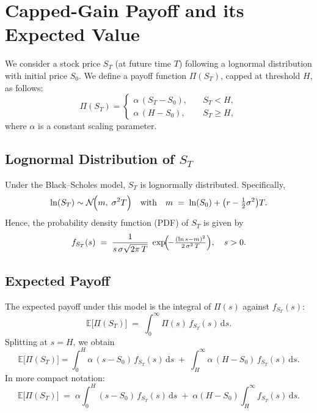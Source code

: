 \documentclass[12pt]{article}
\begin{document}
\section*{Capped-Gain Payoff and its Expected Value}

We consider a stock price $S_T$ (at future time $T$) following a lognormal distribution with initial price $S_0$. 
We define a payoff function $\Pi(S_T)$, capped at threshold $H$, as follows:
\[
\Pi(S_T) 
= 
\begin{cases} 
\alpha\,(S_T - S_0), & \quad S_T < H,\\[6pt]
\alpha\,(H - S_0),   & \quad S_T \ge H,
\end{cases}
\]
where $\alpha$ is a constant scaling parameter.

\subsection*{Lognormal Distribution of $S_T$}
Under the Black--Scholes model, $S_T$ is lognormally distributed. Specifically,
\[
\ln(S_T) \sim \mathcal{N}\!\Bigl(m,\;\sigma^2 T\Bigr)
\quad\text{with}\quad
m \;=\; \ln(S_0) + \bigl(r - \tfrac{1}{2}\sigma^2\bigr) T.
\]
Hence, the probability density function (PDF) of $S_T$ is given by
\[
f_{S_T}(s)
\;=\;
\frac{1}{s\,\sigma \sqrt{2\pi\,T}}
\;\exp\!\Bigl(\!-\tfrac{(\ln s - m)^2}{2\,\sigma^2\,T}\Bigr),
\quad
s>0.
\]

\subsection*{Expected Payoff}
The expected payoff under this model is the integral of $\Pi(s)$ against $f_{S_T}(s)$:
\[
\mathbb{E}\bigl[\Pi(S_T)\bigr]
\;=\;
\int_{0}^{\infty} \Pi(s)\,f_{S_T}(s)\,\mathrm{d}s.
\]
Splitting at $s=H$, we obtain
\[
\mathbb{E}\bigl[\Pi(S_T)\bigr]
=
\int_{0}^{H} \alpha\,(s - S_0)\,f_{S_T}(s)\,\mathrm{d}s
\;+\;
\int_{H}^{\infty} \alpha\,(H - S_0)\,f_{S_T}(s)\,\mathrm{d}s.
\]
In more compact notation:
\[
\mathbb{E}\bigl[\Pi(S_T)\bigr]
\;=\;
\alpha 
\int_{0}^{H} (s - S_0)\,f_{S_T}(s)\,\mathrm{d}s
\;+\;
\alpha (H - S_0) 
\int_{H}^{\infty} f_{S_T}(s)\,\mathrm{d}s.
\]
\end{document}
